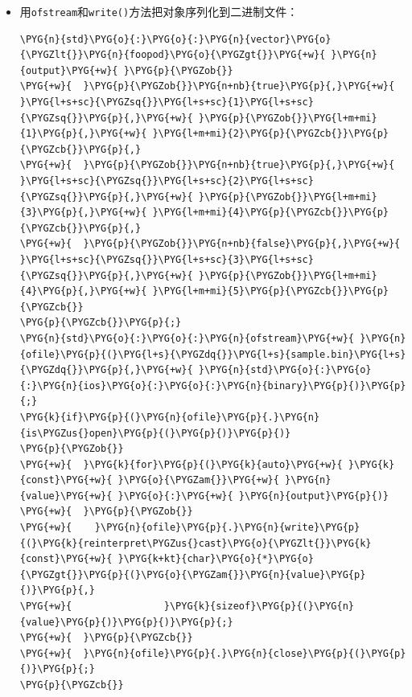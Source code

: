 \begin{itemize}
\item 用\texttt{ofstream}和\texttt{write()}方法把对象序列化到二进制文件：



\begin{codeblockbg}
\begin{Verbatim}[commandchars=\\\{\},breaklines=true,breakanywhere=true,fontsize=\codefont,xleftmargin=17bp]
\PYG{n}{std}\PYG{o}{:}\PYG{o}{:}\PYG{n}{vector}\PYG{o}{\PYGZlt{}}\PYG{n}{foopod}\PYG{o}{\PYGZgt{}}\PYG{+w}{ }\PYG{n}{output}\PYG{+w}{ }\PYG{p}{\PYGZob{}}
\PYG{+w}{  }\PYG{p}{\PYGZob{}}\PYG{n+nb}{true}\PYG{p}{,}\PYG{+w}{ }\PYG{l+s+sc}{\PYGZsq{}}\PYG{l+s+sc}{1}\PYG{l+s+sc}{\PYGZsq{}}\PYG{p}{,}\PYG{+w}{ }\PYG{p}{\PYGZob{}}\PYG{l+m+mi}{1}\PYG{p}{,}\PYG{+w}{ }\PYG{l+m+mi}{2}\PYG{p}{\PYGZcb{}}\PYG{p}{\PYGZcb{}}\PYG{p}{,}
\PYG{+w}{  }\PYG{p}{\PYGZob{}}\PYG{n+nb}{true}\PYG{p}{,}\PYG{+w}{ }\PYG{l+s+sc}{\PYGZsq{}}\PYG{l+s+sc}{2}\PYG{l+s+sc}{\PYGZsq{}}\PYG{p}{,}\PYG{+w}{ }\PYG{p}{\PYGZob{}}\PYG{l+m+mi}{3}\PYG{p}{,}\PYG{+w}{ }\PYG{l+m+mi}{4}\PYG{p}{\PYGZcb{}}\PYG{p}{\PYGZcb{}}\PYG{p}{,}
\PYG{+w}{  }\PYG{p}{\PYGZob{}}\PYG{n+nb}{false}\PYG{p}{,}\PYG{+w}{ }\PYG{l+s+sc}{\PYGZsq{}}\PYG{l+s+sc}{3}\PYG{l+s+sc}{\PYGZsq{}}\PYG{p}{,}\PYG{+w}{ }\PYG{p}{\PYGZob{}}\PYG{l+m+mi}{4}\PYG{p}{,}\PYG{+w}{ }\PYG{l+m+mi}{5}\PYG{p}{\PYGZcb{}}\PYG{p}{\PYGZcb{}}
\PYG{p}{\PYGZcb{}}\PYG{p}{;}
\PYG{n}{std}\PYG{o}{:}\PYG{o}{:}\PYG{n}{ofstream}\PYG{+w}{ }\PYG{n}{ofile}\PYG{p}{(}\PYG{l+s}{\PYGZdq{}}\PYG{l+s}{sample.bin}\PYG{l+s}{\PYGZdq{}}\PYG{p}{,}\PYG{+w}{ }\PYG{n}{std}\PYG{o}{:}\PYG{o}{:}\PYG{n}{ios}\PYG{o}{:}\PYG{o}{:}\PYG{n}{binary}\PYG{p}{)}\PYG{p}{;}
\PYG{k}{if}\PYG{p}{(}\PYG{n}{ofile}\PYG{p}{.}\PYG{n}{is\PYGZus{}open}\PYG{p}{(}\PYG{p}{)}\PYG{p}{)}
\PYG{p}{\PYGZob{}}
\PYG{+w}{  }\PYG{k}{for}\PYG{p}{(}\PYG{k}{auto}\PYG{+w}{ }\PYG{k}{const}\PYG{+w}{ }\PYG{o}{\PYGZam{}}\PYG{+w}{ }\PYG{n}{value}\PYG{+w}{ }\PYG{o}{:}\PYG{+w}{ }\PYG{n}{output}\PYG{p}{)}
\PYG{+w}{  }\PYG{p}{\PYGZob{}}
\PYG{+w}{    }\PYG{n}{ofile}\PYG{p}{.}\PYG{n}{write}\PYG{p}{(}\PYG{k}{reinterpret\PYGZus{}cast}\PYG{o}{\PYGZlt{}}\PYG{k}{const}\PYG{+w}{ }\PYG{k+kt}{char}\PYG{o}{*}\PYG{o}{\PYGZgt{}}\PYG{p}{(}\PYG{o}{\PYGZam{}}\PYG{n}{value}\PYG{p}{)}\PYG{p}{,}
\PYG{+w}{                }\PYG{k}{sizeof}\PYG{p}{(}\PYG{n}{value}\PYG{p}{)}\PYG{p}{)}\PYG{p}{;}
\PYG{+w}{  }\PYG{p}{\PYGZcb{}}
\PYG{+w}{  }\PYG{n}{ofile}\PYG{p}{.}\PYG{n}{close}\PYG{p}{(}\PYG{p}{)}\PYG{p}{;}
\PYG{p}{\PYGZcb{}}
\end{Verbatim}
\end{codeblockbg}



\end{itemize}
